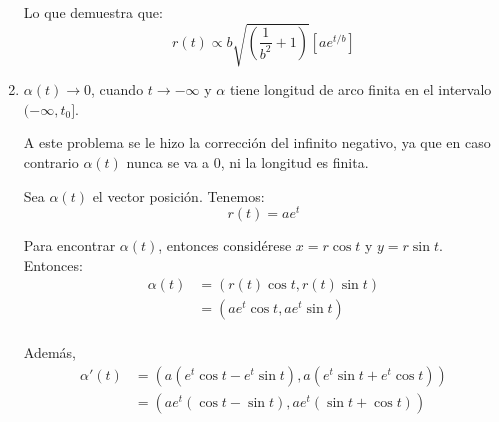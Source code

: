 \begin{problema}
\begin{enumerate}
\begin{sol}
        Lo que demuestra que: 
        $$r(t)\propto b\sqrt{\left(\frac{1}{b^2}+1\right)} \left[ae^{t/b}\right]$$

    \end{sol}
    \item $\alpha(t) \rightarrow 0$, cuando $t \rightarrow -\infty$ y $\alpha$ tiene longitud de arco finita en el intervalo $(-\infty, t_0]$.
    \begin{cajita}
        A este problema se le hizo la corrección del infinito negativo, ya que en caso contrario $\alpha(t)$ nunca se va a 0, ni la longitud es finita. 
    \end{cajita}
    \begin{sol}
        Sea $\alpha(t)$ el vector posición. Tenemos: 
        $$r(t)= ae^{t}$$

        Para encontrar $\alpha(t)$, entonces considérese $x=r\cos t$ y $y=r\sin t$. Entonces: 
        \begin{align*}
            \alpha(t) & =(r(t)\cos t,r(t)\sin t)\\
                      &= (ae^{t}\cos t,ae^{t}\sin t)\\
        \end{align*}

        Además, 
        \begin{align*}
            \alpha'(t) &= \left(a\left(e^{t}\cos t - e^{t}\sin t \right),a\left(e^{t}\sin t+ e^{t}\cos t \right) \right)\\
            &= \left(ae^{t}\left(\cos t -\sin t \right),ae^{t}\left(\sin t+ \cos t \right) \right)\\
        \end{align*}



\end{sol}
\end{enumerate}
\end{problema}
